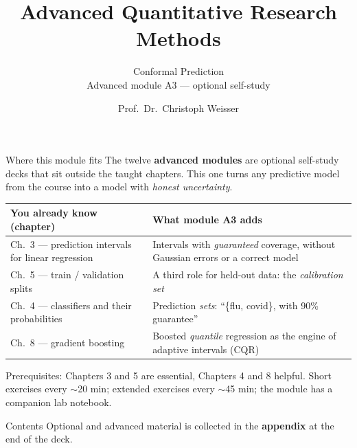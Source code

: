 \documentclass[aspectratio=169,11pt]{beamer}
\title{Advanced Quantitative Research Methods}
\subtitle{Conformal Prediction\\[2pt]{\small Advanced module A3 --- optional self-study}}
\author{Prof.\ Dr.\ Christoph Weisser}
\date{}\graphicspath{{images/}}
\begin{document}
\begin{frame}[plain]\titlepage\end{frame}

\begin{frame}{Where this module fits}
  \footnotesize
  The twelve \textbf{advanced modules} are optional self-study decks that sit outside
  the taught chapters. This one turns any predictive model from the course into a model
  with \emph{honest uncertainty}.
  \begin{center}
  \begin{tabular}{@{}p{4.6cm}p{8.6cm}@{}}
    \toprule
    \textbf{You already know (chapter)} & \textbf{What module A3 adds} \\
    \midrule
    Ch.\ 3 --- prediction intervals for linear regression &
      Intervals with \emph{guaranteed} coverage, without Gaussian errors or a correct
      model \\
    Ch.\ 5 --- train / validation splits &
      A third role for held-out data: the \emph{calibration set} \\
    Ch.\ 4 --- classifiers and their probabilities &
      Prediction \emph{sets}: ``\{flu, covid\}, with 90\% guarantee'' \\
    Ch.\ 8 --- gradient boosting &
      Boosted \emph{quantile} regression as the engine of adaptive intervals (CQR) \\
    \bottomrule
  \end{tabular}
  \end{center}
  \vspace{2pt}
  {\scriptsize Prerequisites: Chapters 3 and 5 are essential, Chapters 4 and 8 helpful.
  Short exercises every $\sim$20 min; extended exercises every $\sim$45 min; the module
  has a companion lab notebook.}
\end{frame}

\begin{frame}{Contents}\small\tableofcontents[hideallsubsections]
  \vfill
  {\tiny Optional and advanced material is collected in the \textbf{appendix} at the end of the deck.}
\end{frame}
\end{document}

